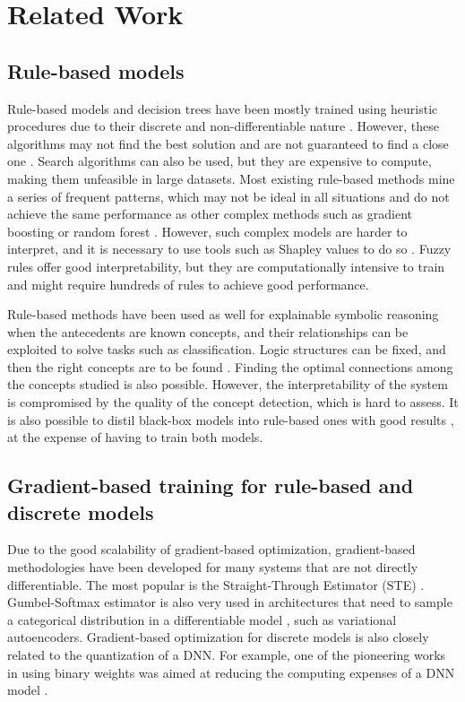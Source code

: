 \section{Related Work}
\subsection{Rule-based models}
Rule-based models and decision trees have been mostly trained using heuristic procedures due to their discrete and non-differentiable nature \citep{wei2019generalized}. However, these algorithms may not find the best solution and are not guaranteed to find a close one \citep{rudolph1994convergence}. Search algorithms can also be used, but they are expensive to compute, making them unfeasible in large datasets. Most existing rule-based methods mine a series of frequent patterns, which may not be ideal in all situations and do not achieve the same performance as other complex methods such as gradient boosting or random forest \citep{yuan2017improved}. However, such complex models are harder to interpret, and it is necessary to use tools such as Shapley values to do so \citep{lundberg2020local}. Fuzzy rules offer good interpretability, but they are computationally intensive to train \citep{mendel2023explainable} and might require hundreds of rules to achieve good performance. 

Rule-based methods have been used as well for explainable symbolic reasoning when the antecedents are known concepts, and their relationships can be exploited to solve tasks such as classification. Logic structures can be fixed, and then the right concepts are to be found \citep{petersen2022, barbiero2023interpretable}. Finding the optimal connections among the concepts studied \citep{vemuri2024enhancing} is also possible. However, the interpretability of the system is compromised by the quality of the concept detection, which is hard to assess. It is also possible to distil black-box models into rule-based ones with good results \cite{li2024interpreting}, at the expense of having to train both models.

\subsection{Gradient-based training for rule-based and discrete models} 
Due to the good scalability of gradient-based optimization, gradient-based methodologies have been developed for many systems that are not directly differentiable. The most popular is the Straight-Through Estimator (STE) \citep{bengio2013estimating}. Gumbel-Softmax estimator is also very used in architectures that need to sample a categorical distribution in a differentiable model \citep{jang2016categorical}, such as variational autoencoders. Gradient-based optimization for discrete models is also closely related to the quantization of a DNN. For example, one of the pioneering works in using binary weights was aimed at reducing the computing expenses of a DNN model \citep{courbariaux2015binaryconnect}.

